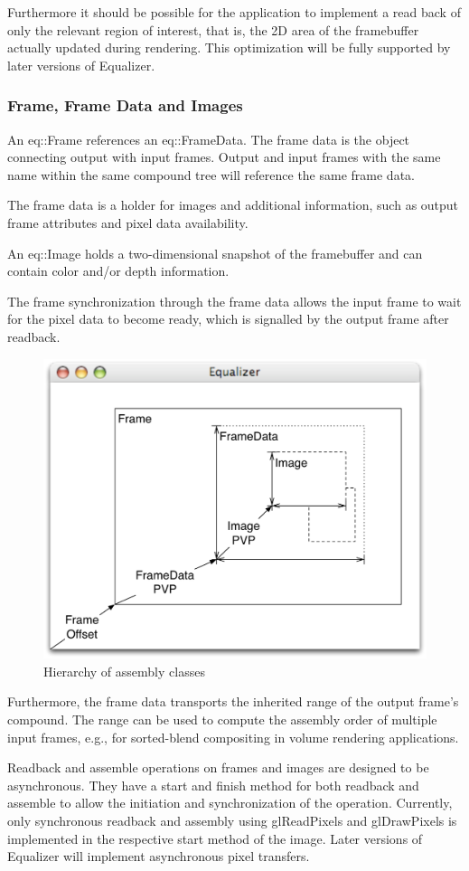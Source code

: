 \documentclass[10pt,a4]{scrartcl}
\begin{document}
Furthermore it should be possible for the application to implement a
read back of only the relevant region of interest, that is, the 2D area
of the framebuffer actually updated during rendering. This optimization
will be fully supported by later versions of Equalizer.

\subsubsection{Frame, Frame Data and Images}

An \textsf{eq::Frame} references an \textsf{eq::Fra\-me\-Data}. The
frame data is the object connecting output with input frames. Output and
input frames with the same name within the same compound tree will
reference the same frame data.

The frame data is a holder for images and additional information, such
as output frame attributes and pixel data availability.

An \textsf{eq::Image} holds a
two-dimensional snapshot of the framebuffer and can contain color and/or
depth information.

The frame synchronization through the frame data allows the input frame
to wait for the pixel data to become ready, which is signalled by the
output frame after readback.

\begin{figure}
  \includegraphics[width=.618\textwidth]{images/assembly.pdf}
  {\caption{\small\label{fAssembly}Hierarchy of assembly classes}}
\end{figure}
Furthermore, the frame data transports the inherited range of the output
frame's compound. The range can be used to compute the assembly order of
multiple input frames, e.g., for sorted-blend compositing in volume
rendering applications.

Readback and assemble operations on frames and images are designed to be
asynchronous. They have a start and finish method for both readback and
assemble to allow the initiation and synchronization of the operation.
Currently, only synchronous readback and assembly using
\textsf{glReadPixels} and \textsf{glDrawPixels} is implemented in the
respective start method of the image. Later versions of Equalizer will
implement asynchronous pixel transfers.
\end{document}
